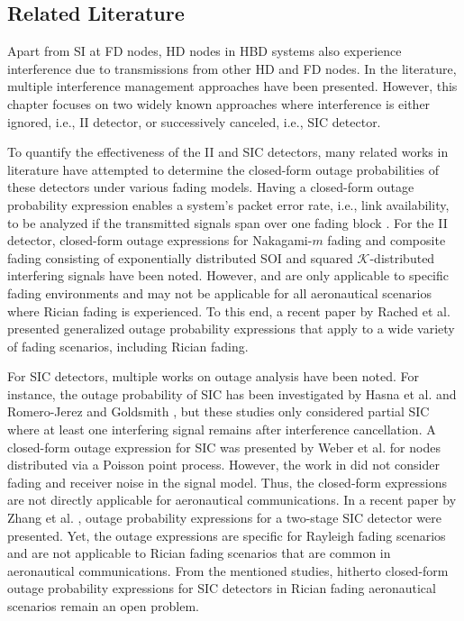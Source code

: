 \subsection{Related Literature}
Apart from SI at FD nodes, HD nodes in HBD systems also experience interference due to transmissions from other HD and FD nodes. In the literature, multiple interference management approaches have been presented. However, this chapter focuses on two widely known approaches where interference is either ignored, i.e., II detector, or successively canceled, i.e., SIC detector. 

To quantify the effectiveness of the II and SIC detectors, many related works in literature have attempted to determine the closed-form outage probabilities of these detectors under various fading models. Having a closed-form outage probability expression enables a system's packet error rate, i.e., link availability, to be analyzed if the transmitted signals span over one fading block \cite{lin2013outage}. For the II detector, closed-form outage expressions for Nakagami-$m$ fading \cite{yao1992investigations} and composite fading consisting of exponentially distributed SOI and squared ${\mathcal{K}}$-distributed interfering signals \cite{bithas2015mobile} have been noted. However, \cite{yao1992investigations} and \cite{bithas2015mobile} are only applicable to specific fading environments and may not be applicable for all aeronautical scenarios where Rician fading is experienced. To this end, a recent paper by Rached et al. \cite{rached2017unified} presented generalized outage probability expressions that apply to a wide variety of fading scenarios, including Rician fading.

For SIC detectors, multiple works on outage analysis have been noted. For instance, the outage probability of SIC has been investigated by Hasna et al. \cite{hasna2003performance} and Romero-Jerez and Goldsmith \cite{romero2008receive}, but these studies only considered partial SIC where at least one interfering signal remains after interference cancellation. A closed-form outage expression for SIC was presented by Weber et al. \cite{weber2007transmission} for nodes distributed via a Poisson point process. However, the work in \cite{weber2007transmission} did not consider fading and receiver noise in the signal model. Thus, the closed-form expressions are not directly applicable for aeronautical communications. In a recent paper by Zhang et al. \cite{zhang2017full}, outage probability expressions for a two-stage SIC detector were presented. Yet, the outage expressions are specific for Rayleigh fading scenarios and are not applicable to Rician fading scenarios that are common in aeronautical communications. From the mentioned studies, hitherto closed-form outage probability expressions for SIC detectors in Rician fading aeronautical scenarios remain an open problem.

